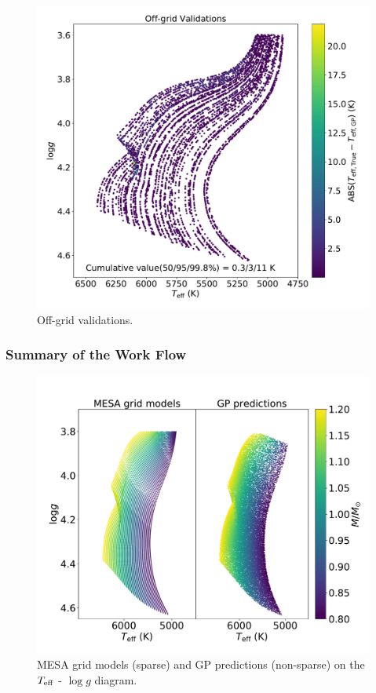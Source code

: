  \begin{figure}
	\includegraphics[width=1.0\columnwidth]{off_validation_hr.pdf}
    \caption{Off-grid validations.}  
    \label{fig:off-grid_validation}
\end{figure}


\subsubsection{Summary of the Work Flow}
 
\begin{figure}
	\includegraphics[width=1.0\columnwidth]{2d_hrd_compare.pdf}
    \caption{MESA grid models (sparse) and GP predictions (non-sparse) on the $T_{\rm eff}$ - $\log g$ diagram.}
    \label{fig:gpmodel}
\end{figure}


